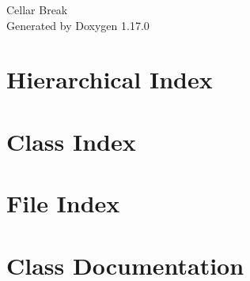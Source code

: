 \documentclass[twoside]{book}
\newcommand{\+}{\discretionary{\mbox{\scriptsize$\hookleftarrow$}}{}{}}
\newcommand{\clearemptydoublepage}{%
    \newpage{\pagestyle{empty}\cleardoublepage}%
  }
\begin{document}
  \raggedbottom
    \hypersetup{pageanchor=false,
                bookmarksnumbered=true,
                pdfencoding=unicode
               }
  \begin{titlepage}
  \vspace*{7cm}
  \begin{center}%
  {\Large Cellar Break}\\
  \vspace*{1cm}
  {\large Generated by Doxygen 1.17.0}\\
  \end{center}
  \end{titlepage}
  \clearemptydoublepage
  \tableofcontents
  \clearemptydoublepage
  \hypersetup{pageanchor=true}
\chapter{Hierarchical Index}

\chapter{Class Index}

\chapter{File Index}

\chapter{Class Documentation}





































\end{document}
